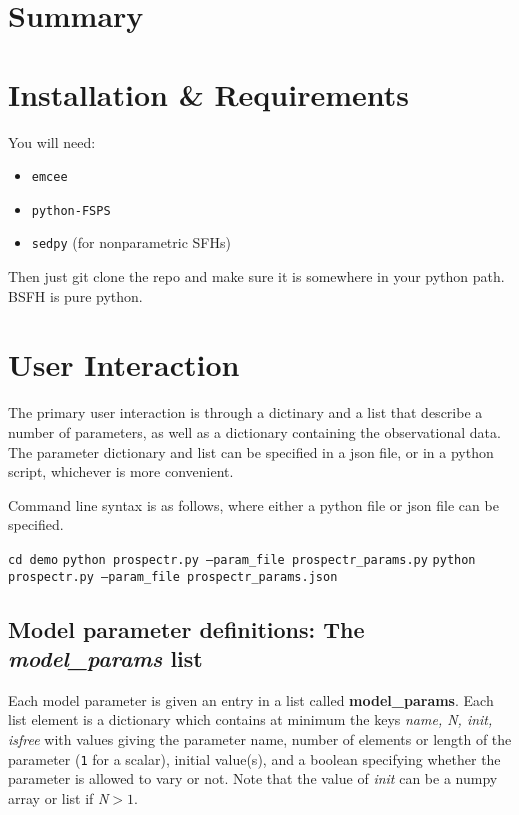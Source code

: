 

\section{Summary}

\section{Installation \& Requirements}
You will need:

\begin{itemize}
\item \texttt{emcee}
\item \texttt{python-FSPS}
\item \texttt{sedpy} (for nonparametric SFHs)
\end{itemize}

Then just git clone the repo and make sure it is somewhere in your
python path.  BSFH is pure python.

\section{User Interaction}
The primary user interaction is through a dictinary and a list that
describe a number of parameters, as well as a dictionary containing
the observational data.  The parameter dictionary and list can be
specified in a json file, or in a python script, whichever is more
convenient.

Command line syntax is as follows, where either a python file or json
file can be specified.
\begin{center}
\texttt{cd demo}
\texttt{python prospectr.py --param_file prospectr_params.py}
\texttt{python prospectr.py --param_file prospectr_params.json}
\end{center}

\subsection{Model parameter definitions: The \emph{model_params} list}
Each model parameter is given an entry in a list called {\bf
model_params}. Each list element is a dictionary which contains at
minimum the keys {\it name, N, init, isfree} with values giving the
parameter name, number of elements or length of the parameter
(\texttt{1} for a scalar), initial value(s), and a boolean specifying
whether the parameter is allowed to vary or not.  Note that the value
of {\it init} can be a numpy array or list if {\it N}$>1$.

